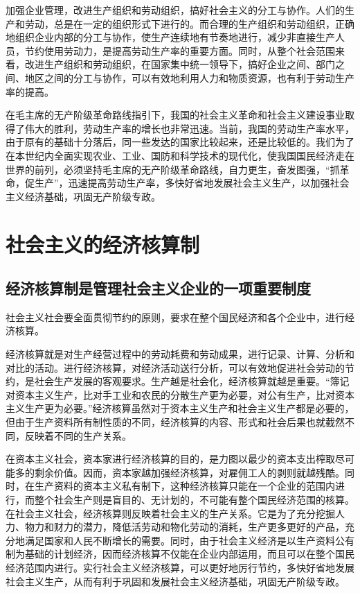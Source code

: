 \documentclass{book}
\begin{document}
加强企业管理，改进生产组织和劳动组织，搞好社会主义的分工与协作。人们的生产和劳动，总是在一定的组织形式下进行的。而合理的生产组织和劳动组织，正确地组织企业内部的分工与协作，使生产连续地有节奏地进行，减少非直接生产人员，节约使用劳动力，是提高劳动生产率的重要方面。同时，从整个社会范围来看，改进生产组织和劳动组织，在国家集中统一领导下，搞好企业之间、部门之间、地区之间的分工与协作，可以有效地利用人力和物质资源，也有利于劳动生产率的提高。

在毛主席的无产阶级革命路线指引下，我国的社会主义革命和社会主义建设事业取得了伟大的胜利，劳动生产率的增长也非常迅速。当前，我国的劳动生产率水平，由于原有的基础十分落后，同一些发达的国家比较起来，还是比较低的。我们为了在本世纪内全面实现农业、工业、国防和科学技术的现代化，使我国国民经济走在世界的前列，必须坚持毛主席的无产阶级革命路线，自力更生，奋发图强，“抓革命，促生产”，迅速提高劳动生产率，多快好省地发展社会主义生产，以加强社会主义经济基础，巩固无产阶级专政。


\section{社会主义的经济核算制}

\subsection{经济核算制是管理社会主义企业的一项重要制度}

社会主义社会要全面贯彻节约的原则，要求在整个国民经济和各个企业中，进行经济核算。

经济核算就是对生产经营过程中的劳动耗费和劳动成果，进行记录、计算、分析和对比的活动。进行经济核算，对经济活动送行分析，可以有效地促进社会劳动的节约，是社会生产发展的客观要求。生产越是社会化，经济核算就越是重要。“簿记对资本主义生产，比对手工业和农民的分散生产更为必要，对公有生产，比对资本主义生产更为必要。”经济核算虽然对于资本主义生产和社会主义生产都是必要的，但由于生产资料所有制性质的不同，经济核算的内容、形式和社会后果也就截然不同，反映着不同的生产关系。

在资本主义社会，资本家进行经济核算的目的，是力图以最少的资本支出榨取尽可能多的剩余价值。因而，资本家越加强经济核算，对雇佣工人的剥则就越残酷。同时，在生产资料的资本主义私有制下，这种经济核算只能在一个企业的范围内进行，而整个社会生产则是盲目的、无计划的，不可能有整个国民经济范围的核算。在社会主义社会，经济核算则反映着社会主义的生产关系。它是为了充分挖掘人力、物力和财力的潜力，降低活劳动和物化劳动的消耗，生产更多更好的产品，充分地满足国家和人民不断增长的需要。同时，由于社会主义经济是以生产资料公有制为基础的计划经济，因而经济核算不仅能在企业内部运用，而且可以在整个国民经济范围内进行。实行社会主义经济核算，可以更好地厉行节约，多快好省地发展社会主义生产，从而有利于巩固和发展社会主义经济基础，巩固无产阶级专政。
\end{document}
